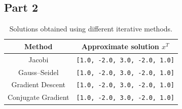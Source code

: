 \documentclass{article}
\begin{document}
\subsection*{Part 2}

\begin{table}[ht]
\centering
\caption{Solutions obtained using different iterative methods.}
\label{tab:iterative-solutions}
\begin{tabular}{c c}
\hline
Method & Approximate solution $x^T$ \\
\hline
Jacobi &
\texttt{[1.0, -2.0, 3.0, -2.0, 1.0]} \\

Gauss--Seidel &
\texttt{[1.0, -2.0, 3.0, -2.0, 1.0]} \\

Gradient Descent &
\texttt{[1.0, -2.0, 3.0, -2.0, 1.0]} \\

Conjugate Gradient &
\texttt{[1.0, -2.0, 3.0, -2.0, 1.0]} \\
\hline
\end{tabular}
\end{table}
\end{document}
